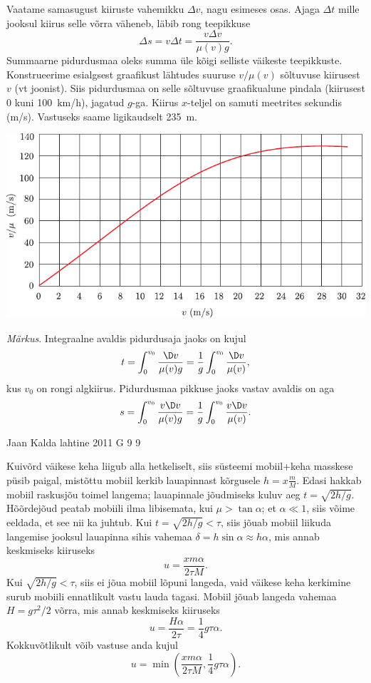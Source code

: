 \documentclass[11pt]{article}
\begin{document}
{{\osa Vaatame samasugust kiiruste vahemikku $\Delta v$, nagu esimeses osas. Ajaga $\Delta t$ mille jooksul kiirus selle võrra väheneb, läbib rong teepikkuse
\[
\Delta s = v\Delta t = \frac{v\Delta v}{\mu (v)g}.
\]
Summaarne pidurdusmaa oleks summa üle kõigi selliste väikeste teepikkuste. Konstrueerime esialgsest graafikust lähtudes suuruse $v/\mu (v)$ sõltuvuse kiirusest $v$ (vt joonist). Siis pidurdusmaa on selle sõltuvuse graafikualune pindala (kiirusest \num{0} kuni \SI{100}{km/h}), jagatud $g$-ga. Kiirus $x$-teljel on samuti meetrites sekundis (\si{m/s}). Vastuseks saame ligikaudselt \SI{235}{m}.

\begin{center}
	\includegraphics[width=\linewidth]{2006-lahg-10-lah2}
\end{center}

\emph{Märkus}. Integraalne avaldis pidurdusaja jaoks on kujul
\[
t=\int_{0}^{v_{0}} \frac{\D v}{\mu(v) g}=\frac{1}{g} \int_{0}^{v_{0}} \frac{\D v}{\mu(v)},
\]
kus $v_0$ on rongi algkiirus. Pidurdusmaa pikkuse jaoks vastav avaldis on aga
\[
s=\int_{0}^{v_{0}} \frac{v \D v}{\mu(v) g}=\frac{1}{g} \int_{0}^{v_{0}} \frac{v \D v}{\mu(v)}.
\]
\fi
}

{Jaan Kalda} %
{lahtine} %
{2011} %
{G 9} %
{9} %
{

\ifSolution
Kuivõrd väikese keha liigub alla hetkeliselt, siis süsteemi mobiil+keha masskese püsib paigal, mistõttu mobiil kerkib lauapinnast kõrgusele $h=x\frac mM$.
Edasi hakkab mobiil raskusjõu toimel langema; lauapinnale jõudmiseks kuluv aeg $t=\sqrt{2h/g}$. Hõõrdejõud peatab mobiili ilma libisemata, kui $\mu>\tan\alpha$; et
$\alpha \ll 1$, siis võime eeldada, et see nii ka juhtub. Kui $t=\sqrt{2h/g}<\tau$, siis jõuab mobiil liikuda langemise jooksul lauapinna sihis vahemaa $\delta=h\sin\alpha\approx h\alpha$,
mis annab keskmiseks kiiruseks $$u=\frac{xm\alpha}{2\tau M}.$$ Kui $\sqrt{2h/g}<\tau$, siis ei jõua mobiil lõpuni langeda, vaid väikese keha kerkimine surub mobiili ennatlikult vastu lauda tagasi.
Mobiil jõuab langeda vahemaa $H=g\tau^2/2$ võrra, mis annab keskmiseks kiiruseks
$$u=\frac{H\alpha}{2\tau}=\frac 14 g\tau\alpha.$$
Kokkuvõtlikult võib vastuse anda kujul
$$u=\min\left(\frac{xm\alpha}{2\tau M}, \frac 14 g\tau\alpha\right).$$
\fi
}

}
\end{document}
